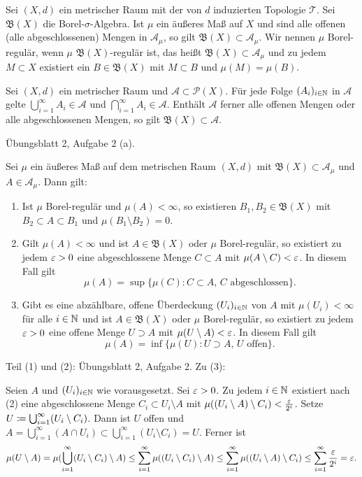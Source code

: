 \documentclass[a4paper,twoside,DIV15,BCOR12mm]{scrbook}
\newcommand{\A}{\mathcal A}
\newcommand{\borel}{\mathfrak B}
\begin{document}
Sei $(X,d)$ ein metrischer Raum mit der von $d$ induzierten Topologie $\mathcal T$. Sei $\borel(X)$ die Borel-$\sigma$-Algebra. Ist $\mu$ ein äußeres Maß auf $X$ und sind alle offenen (alle abgeschlossenen) Mengen in $\A_\mu$, so gilt $\borel(X)\subset \A_\mu$. Wir nennen $\mu$ Borel-regulär, wenn $\mu$ $\borel(X)$-regulär ist, das heißt $\borel(X)\subset \A_\mu$ und zu jedem $M\subset X$ existiert ein $B\in\borel(X)$ mit $M\subset B$ und $\mu(M)=\mu(B)$.


\begin{lemma}
\label{lem:2.1}
Sei $(X,d)$ ein metrischer Raum und $\A\subset \mathcal P(X)$. Für jede Folge $(A_i)_{i\in\mathbb{N}}$ in $\A$ gelte $\bigcup_{i=1}^\infty A_i \in \A$ und $\bigcap_{i=1}^\infty A_i \in \A$. Enthält $\A$ ferner alle offenen Mengen oder alle abgeschlossenen Mengen, so gilt $\borel(X)\subset \A$.
\end{lemma}

\begin{beweis}
Übungsblatt 2, Aufgabe 2 (a).
\end{beweis}

\begin{satz}
\label{satz:2.2}
Sei $\mu$ ein äußeres Maß auf dem metrischen Raum $(X,d)$ mit $\borel(X)\subset\A_\mu$ und $A\in\A_\mu$. Dann gilt:
\begin{enumerate}
\item Ist $\mu$ Borel-regulär und $\mu(A)<\infty$, so existieren $B_1,B_2\in\borel(X)$ mit $B_2\subset A\subset B_1$ und $\mu(B_1\setminus B_2)=0$.
\item Gilt $\mu(A)<\infty$ und ist $A\in \borel(X)$ oder $\mu$ Borel-regulär, so existiert zu jedem $\varepsilon>0$ eine abgeschlossene Menge $C\subset A$ mit $\mu(A\setminus C)<\varepsilon$. In diesem Fall gilt
\[
\mu(A) = \sup\{\mu(C): C\subset A,\, C\text{ abgeschlossen}\}.
\]
\item Gibt es eine abzählbare, offene Überdeckung $(U_i)_{i\in\mathbb{N}}$ von $A$ mit $\mu(U_i)<\infty$ für alle $i\in\mathbb{N}$ und ist $A\in\borel(X)$ oder $\mu$ Borel-regulär, so existiert zu jedem $\varepsilon>0$ eine offene Menge $U\supset A$ mit $\mu(U\setminus A)<\varepsilon$. In diesem Fall gilt
\[
\mu(A) = \inf\{\mu(U): U\supset A,\, U\text{ offen}\}.
\]
\end{enumerate}
\end{satz}

\begin{beweis}
Teil (1) und (2): Übungsblatt 2, Aufgabe 2. Zu (3):

Seien $A$ und $(U_i)_{i\in\mathbb{N}}$ wie vorausgesetzt. Sei $\varepsilon>0$. Zu jedem $i\in\mathbb{N}$ existiert nach (2) eine abgeschlossene Menge $C_i\subset U_i\setminus A$ mit $\mu( (U_i\setminus A)\setminus C_i)< \frac{\varepsilon}{2^i}$. Setze $U\da \bigcup_{i=1}^\infty (U_i \setminus C_i)$. Dann ist $U$ offen und $A = \bigcup_{i=1}^\infty (A\cap U_i) \subset \bigcup_{i=1}^\infty (U_i\setminus C_i) = U$. Ferner ist
\begin{align*}
\mu(U\setminus A) 
= \mu(\bigcup_{i=1}^\infty (U_i\setminus C_i) \setminus A)
\le \sum_{i=1}^\infty \mu( (U_i\setminus C_i) \setminus A) 
\le \sum_{i=1}^\infty \mu( (U_i\setminus A) \setminus C_i) 
\le \sum_{i=1}^\infty \frac {\varepsilon}{2^i} = \varepsilon.
\end{align*}
\end{beweis}
\end{document}
